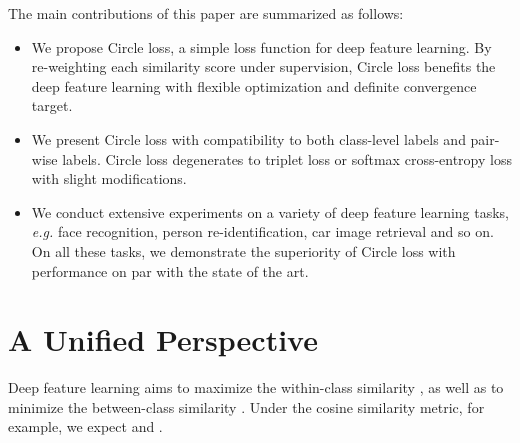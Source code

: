 \documentclass[10pt,twocolumn,letterpaper]{article}
\begin{document}
The main contributions of this paper are summarized as follows:
\begin {itemize}
\item We propose Circle loss, a simple loss function for deep feature learning. By re-weighting each similarity score under supervision, Circle loss benefits the deep feature learning with flexible optimization and definite convergence target. 
\item We present Circle loss with compatibility to both class-level labels and pair-wise labels. Circle loss degenerates to triplet loss or softmax cross-entropy loss with slight modifications. \item We conduct extensive experiments on a variety of deep feature learning tasks, \emph{e.g.} face recognition, person re-identification, car image retrieval and so on. On all these tasks, we demonstrate the superiority of Circle loss with performance on par with the state of the art. 
\end {itemize}



































\section{A Unified Perspective}\label{sec:revisit}
Deep feature learning aims to maximize the within-class similarity , as well as to minimize the between-class similarity . Under the cosine similarity metric, for example, we expect  and .
\end{document}
